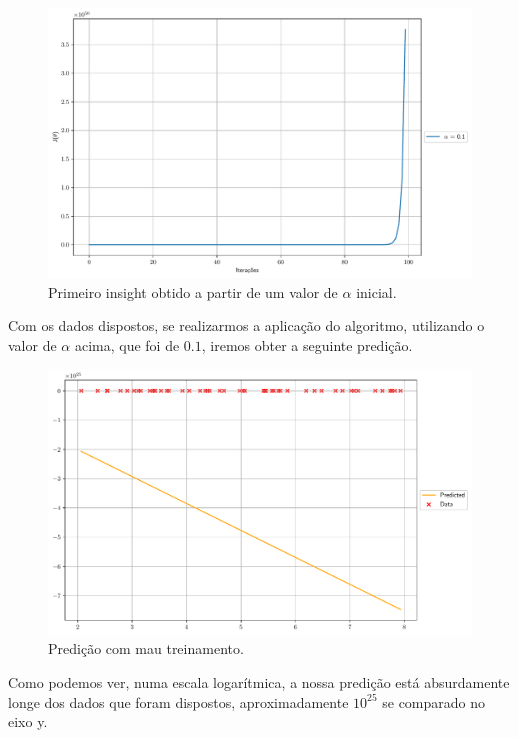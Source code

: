 \documentclass[a4paper, 12pt]{article}
\begin{document}
\begin{figure}[!h]
    \centering
    \includegraphics[width=1\textwidth]{../imgs/first_insight.pdf}
    \caption{Primeiro insight obtido a partir de um valor de $\alpha$ inicial.}
    \label{fig:first_insight}
\end{figure}
\clearpage

Com os dados dispostos, se realizarmos a aplicação do algoritmo, utilizando o valor de $\alpha$ acima, que foi de
$0.1$, iremos obter a seguinte predição.
\begin{figure}[!h]
    \centering
    \includegraphics[width=1\textwidth]{../imgs/first_predicted.pdf}
    \caption{Predição com mau treinamento.}
    \label{fig:data}
\end{figure}

Como podemos ver, numa escala logarítmica, a nossa predição está absurdamente longe dos dados que foram
dispostos, aproximadamente $10^{25}$ se comparado no eixo y.
\clearpage
\end{document}
